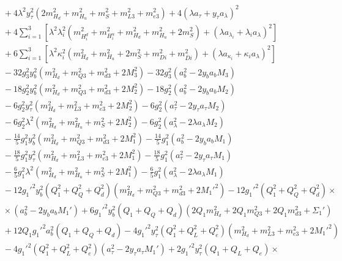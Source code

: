 \documentclass[preprint,amsmath,amssymb,aps,superscriptaddress,prd,showpacs,floatfix,nofootinbib]{revtex4-1}
\begin{document}
\begin{subequations}
\begin{align}
&{}+4\lambda^2y_\tau^2\left ( 2m_{H_d}^2+m_{H_u}^2+m_S^2+m_{L3}^2+m_{e3}^2\right )+4\left ( \lambda a_\tau + y_\tau a_\lambda\right )^2\nonumber\\
&{}+4\sum_{i=1}^3\left [ \lambda^2\lambda_i^2\left ( m_{H_i^d}^2+m_{H_i^u}^2+m_{H_d}^2+m_{H_u}^2+2m_S^2\right )+\left ( \lambda a_{\lambda_i}+\lambda_i a_\lambda\right )^2\right ]\nonumber\\
&{}+6\sum_{i=1}^3\left [ \lambda^2\kappa_i^2\left ( m_{H_d}^2+m_{H_u}^2+2m_S^2+m_{Di}^2+m_{\overline{D}i}^2\right )+\left ( \lambda a_{\kappa_i}+\kappa_i a_\lambda\right )^2\right ]\nonumber\\
&{}-32g_3^2y_b^2\left ( m_{H_d}^2+m_{Q3}^2+m_{d3}^2+2M_3^2\right )-32g_3^2\left ( a_b^2-2y_ba_bM_3\right )\nonumber\\
&{}-18g_2^2y_b^2\left ( m_{H_d}^2+m_{Q3}^2+m_{d3}^2+2M_2^2\right )-18g_2^2\left ( a_b^2-2y_ba_bM_2\right )\nonumber\\
&{}-6g_2^2y_\tau^2\left ( m_{H_d}^2+m_{L3}^2+m_{e3}^2+2M_2^2\right )-6g_2^2\left ( a_\tau^2-2y_\tau a_\tau M_2\right )\nonumber\\
&{}-6g_2^2\lambda^2\left ( m_{H_d}^2+m_{H_u}^2+m_S^2+2M_2^2\right )-6g_2^2\left ( a_\lambda^2-2\lambda a_\lambda M_2\right )\nonumber\\
&{}-\frac{14}{5}g_1^2y_b^2\left ( m_{H_d}^2+m_{Q3}^2+m_{d3}^2+2M_1^2\right )-\frac{14}{5}g_1^2\left ( a_b^2-2y_ba_bM_1\right )\nonumber\\
&{}-\frac{18}{5}g_1^2y_\tau^2\left ( m_{H_d}^2+m_{L3}^2+m_{e3}^2+2M_1^2\right )-\frac{18}{5}g_1^2\left ( a_\tau^2-2y_\tau a_\tau M_1\right )\nonumber\\
&{}-\frac{6}{5}g_1^2\lambda^2\left ( m_{H_d}^2+m_{H_u}^2+m_S^2+2M_1^2\right )-\frac{6}{5}g_1^2\left ( a_\lambda^2-2\lambda a_\lambda M_1\right )\nonumber\\
&{}-12g_1'^2y_b^2\left ( Q_1^2+Q_Q^2+Q_d^2\right )\left ( m_{H_d}^2+m_{Q3}^2+m_{d3}^2+2M_1'^2\right )-12g_1'^2\left ( Q_1^2+Q_Q^2+Q_d^2\right )\times\nonumber\\
&{}\times\left ( a_b^2-2y_b a_b M_1'\right )+6g_1'^2y_b^2\left ( Q_1+Q_Q+Q_d\right )\left ( 2Q_1m_{H_d}^2+2Q_1m_{Q3}^2+2Q_1m_{d3}^2+\Sigma_1'\right )\nonumber\\
&{}+12Q_1g_1'^2a_b^2\left ( Q_1+Q_Q+Q_d\right )-4g_1'^2y_\tau^2\left ( Q_1^2+Q_L^2+Q_e^2\right )\left ( m_{H_d}^2+m_{L3}^2+m_{e3}^2+2M_1'^2\right )\nonumber\\
&{}-4g_1'^2\left ( Q_1^2+Q_L^2+Q_e^2\right )\left ( a_\tau^2-2y_\tau a_\tau M_1'\right )+2g_1'^2y_\tau^2\left ( Q_1+Q_L+Q_e\right )\times\nonumber\\

\end{align}
\end{subequations}
\end{document}
